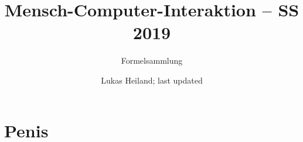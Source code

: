 \documentclass{scrartcl}
\begin{document}
	\title{Mensch-Computer-Interaktion -- SS 2019}
	\subtitle{Formelsammlung}
	\author{Lukas Heiland; last updated}
	
	\maketitle
	\pagebreak
	
	\tableofcontents
	\pagebreak
	
	\section{Penis}
\end{document}
